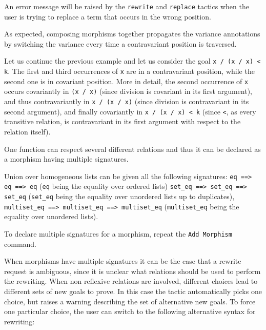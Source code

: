 An error message will be raised by the \texttt{rewrite} and \texttt{replace}
tactics when the user is trying to replace a term that occurs in the
wrong position.

As expected, composing morphisms together propagates the variance annotations by
switching the variance every time a contravariant position is traversed.
\begin{cscexample}
Let us continue the previous example and let us consider the goal
\texttt{x / (x / x) < k}. The first and third occurrences of \texttt{x} are
in a contravariant position, while the second one is in covariant position.
More in detail, the second occurrence of \texttt{x} occurs
covariantly in \texttt{(x / x)} (since division is covariant in its first
argument), and thus contravariantly in \texttt{x / (x / x)} (since division
is contravariant in its second argument), and finally covariantly in
\texttt{x / (x / x) < k} (since \texttt{<}, as every transitive relation,
is contravariant in its first argument with respect to the relation itself).
\end{cscexample}

One function can respect several different relations and thus it can be
declared as a morphism having multiple signatures.

\begin{cscexample}
Union over homogeneous lists can be given all the following signatures:
\texttt{eq ==> eq ==> eq} (\texttt{eq} being the equality over ordered lists)
\texttt{set\_eq ==> set\_eq ==> set\_eq} (\texttt{set\_eq} being the equality
over unordered lists up to duplicates),
\texttt{multiset\_eq ==> multiset\_eq ==> multiset\_eq} (\texttt{multiset\_eq}
being the equality over unordered lists).
\end{cscexample}

To declare multiple signatures for a morphism, repeat the \texttt{Add Morphism}
command.

When morphisms have multiple signatures it can be the case that a rewrite
request is ambiguous, since it is unclear what relations should be used to
perform the rewriting. When non reflexive relations are involved, different
choices lead to different sets of new goals to prove. In this case the
tactic automatically picks one choice, but raises a warning describing the
set of alternative new goals. To force one particular choice, the user
can switch to the following alternative syntax for rewriting:

